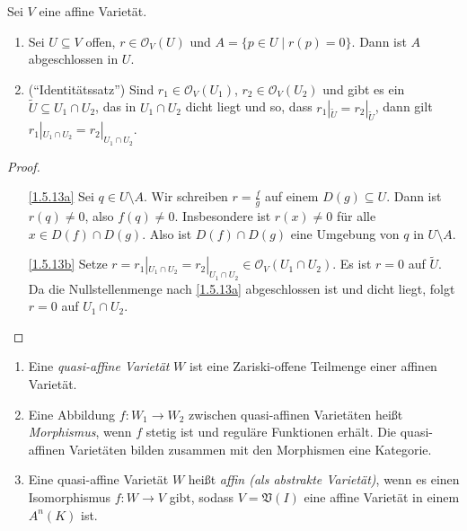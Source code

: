 \documentclass[a4paper,12pt]{scrbook}
\newtheorem{proof}{Beweis}
\def\V{\mathfrak{V}}
\def\O{\mathcal{O}}
\newcommand{\ra}{\longrightarrow}
\newcommand{\restrict}[1]{|_{#1}}
\begin{document}
\begin{bem}\label{1.5.13}
  Sei $V$ eine affine Varietät.
  \begin{enumerate}
  \item{} Sei $U\subseteq V$ offen, $r\in\O_V(U)$ und $A=\{p\in U\mid r(p)=0\}$. Dann ist $A$ abgeschlossen in $U$.
  \item{} (\enquote{Identitätssatz}) Sind $r_1\in\O_V(U_1)$, $r_2\in\O_V(U_2)$ und gibt es ein $\tilde{U}\subseteq
    U_1\cap U_2$, das in $U_1\cap U_2$ dicht liegt und so, dass $r_1\restrict{\tilde{U}}=r_2\restrict{\tilde{U}}$, dann gilt
    $r_1\restrict{U_1\cap U_2}=r_2\restrict{U_1\cap U_2}$.
  \end{enumerate}
\end{bem}
\begin{proof}
  \begin{enumerate}
  \item[\ref{1.5.13a}] Sei $q\in U\setminus A$. Wir schreiben $r=\frac{f}{g}$ auf einem $D(g)\subseteq U$. Dann ist $r(q)\neq0$,
    also $f(q)\neq0$. Insbesondere ist $r(x)\neq0$ für alle $x\in D(f)\cap D(g)$. Also ist $D(f)\cap D(g)$ eine Umgebung von $q$
    in $U\setminus A$.
  \item[\ref{1.5.13b}] Setze $r=r_1\restrict{U_1\cap U_2}=r_2\restrict{U_1\cap U_2}\in \O_V(U_1\cap U_2)$. Es ist $r=0$ auf
    $\tilde{U}$. Da die Nullstellenmenge nach \ref{1.5.13a} abgeschlossen ist und dicht liegt, folgt $r=0$ auf $U_1\cap U_2$.
  \end{enumerate}
\end{proof}

\begin{db}\label{1.5.14}
  \begin{enumerate}
  \item{} Eine \emph{quasi-affine Varietät} $W$ ist eine Zariski-offene Teilmenge einer affinen Varietät.
  \item{} Eine Abbildung $f\colon W_1\ra W_2$ zwischen quasi-affinen Varietäten heißt \emph{Morphismus}, wenn $f$
    stetig ist und reguläre Funktionen erhält. Die quasi-affinen Varietäten bilden zusammen mit den Morphismen eine Kategorie.
  \item{} Eine quasi-affine Varietät $W$ heißt \emph{affin (als abstrakte Varietät)}, wenn es einen Isomorphismus
    $f\colon W\ra V$ gibt, sodass $V=\V(I)$ eine affine Varietät in einem $A^n(K)$ ist.
  \end{enumerate}
\end{db}
\end{document}
